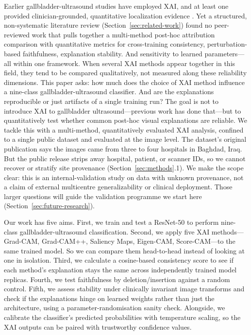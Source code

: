 Earlier gallbladder-ultrasound studies have employed XAI, and at least one provided clinician-grounded, quantitative localization evidence \cite{ref19}. Yet a structured, non-systematic literature review (Section~\ref{sec:related-work}) found no peer-reviewed work that pulls together a multi-method post-hoc attribution comparison with quantitative metrics for cross-training consistency, perturbation-based faithfulness, explanation stability. And sensitivity to learned parameters---all within one framework. When several XAI methods appear together in this field, they tend to be compared qualitatively, not measured along these reliability dimensions. This paper asks: how much does the choice of XAI method influence a nine-class gallbladder-ultrasound classifier. And are the explanations reproducible or just artifacts of a single training run? The goal is not to introduce XAI to gallbladder ultrasound---previous work has done that---but to quantitatively test whether common post-hoc visual explanations are reliable. We tackle this with a multi-method, quantitatively evaluated XAI analysis, confined to a single public dataset and evaluated at the image level. The dataset's original publication says the images came from three to four hospitals in Baghdad, Iraq. But the public release strips away hospital, patient, or scanner IDs, so we cannot recover or stratify site provenance (Section~\ref{sec:methods}.1). We make the scope clear: this is an internal-validation study on data with unknown provenance, not a claim of external multicentre generalizability or clinical deployment. Those larger questions will guide the validation programme we start here (Section~\ref{sec:future-research}).

Our work has five aims. First, we train and test a ResNet-50 to perform nine-class gallbladder-ultrasound classification. Second, we apply five XAI methods---Grad-CAM, Grad-CAM++, Saliency Maps, Eigen-CAM, Score-CAM---to the same trained model. So we can compare them head-to-head instead of looking at one in isolation. Third, we calculate a cosine-based consistency score to see if each method's explanation stays the same across independently trained model replicas. Fourth, we test faithfulness by deletion/insertion against a random control. Fifth, we assess stability under clinically invariant image transforms and check if the explanations hinge on learned weights rather than just the architecture, using a parameter-randomisation sanity check. Alongside, we calibrate the classifier's predicted probabilities with temperature scaling, so the XAI outputs can be paired with trustworthy confidence values.

